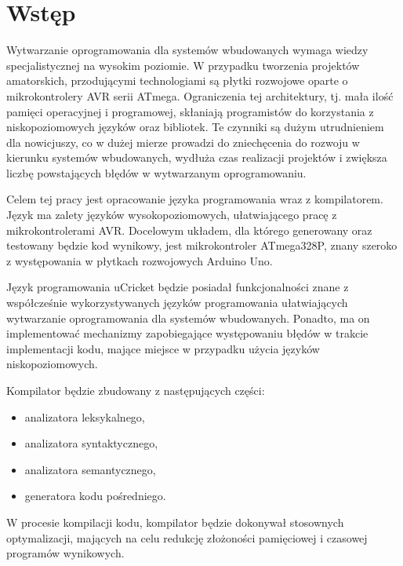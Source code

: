 \chapter{Wstęp}
\label{ch:wstep}

Wytwarzanie oprogramowania dla systemów wbudowanych wymaga wiedzy specjalistycznej na wysokim poziomie. W przypadku tworzenia projektów amatorskich, przodującymi technologiami są płytki rozwojowe oparte o mikrokontrolery AVR serii ATmega. Ograniczenia tej architektury, tj. mała ilość pamięci operacyjnej i programowej, skłaniają programistów do korzystania z niskopoziomowych języków oraz bibliotek. Te czynniki są dużym utrudnieniem dla nowicjuszy, co w dużej mierze prowadzi do zniechęcenia do rozwoju w kierunku systemów wbudowanych, wydłuża czas realizacji projektów i zwiększa liczbę powstających błędów w wytwarzanym oprogramowaniu.

Celem tej pracy jest opracowanie języka programowania wraz z kompilatorem. Język ma zalety języków wysokopoziomowych, ułatwiającego pracę z mikrokontrolerami AVR. Docelowym układem, dla którego generowany oraz testowany będzie kod wynikowy, jest mikrokontroler ATmega328P, znany szeroko z występowania w płytkach rozwojowych Arduino Uno.

Język programowania uCricket będzie posiadał funkcjonalności znane z współcześnie wykorzystywanych języków programowania ułatwiających wytwarzanie oprogramowania dla systemów wbudowanych. Ponadto, ma on implementować mechanizmy zapobiegające występowaniu błędów w trakcie implementacji kodu, mające miejsce w przypadku użycia języków niskopoziomowych.

Kompilator będzie zbudowany z następujących części:
\begin{itemize}
\item analizatora leksykalnego,
\item analizatora syntaktycznego,
\item analizatora semantycznego,
\item generatora kodu pośredniego.
\end{itemize}
W procesie kompilacji kodu, kompilator będzie dokonywał stosownych optymalizacji, mających na celu redukcję złożoności pamięciowej i czasowej programów wynikowych.

